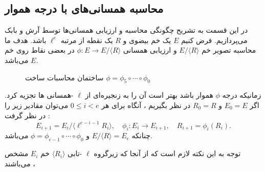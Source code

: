 \documentclass[12pt,a4paper]{article}
\begin{document}
\subsection{\bf   محاسبه همسانی‌های با درجه هموار}\label{smooth_isogeny}

در این قسمت به تشریح چگونگی محاسبه و ارزیابی همسانی‌ها توسط آرش و بابک می‌پردازیم. فرض کنیم 
$E$
یک خم بیضوی و 
$R$
یک نقطه از مرتبه 
$\ell^e$
باشد. هدف ما محاسبه تصویر خم 
$E/ \langle R \rangle $
و ارزیابی همسانی 
$\phi : E \rightarrow E/ \langle R \rangle $
در بعضی نقاط روی خم 
$E$
می‌باشد. 
\begin{figure}[H]\label{}
	\begin{center}
		
		
		\caption{
			ساختمان محاسبات ساخت 
			$\phi = {\phi}_5 \circ \cdots  \circ {\phi}_0$    
		}
		
	\end{center}
\end{figure}
زمانیکه درجه 
$\phi$
هموار باشد بهتر است آن را به زنجیره‌ای از
$\ell$
-همسانی ها تجزیه کرد. اگر
$E_0 = E$
و
$R_0 = R$
در نظر بگیریم ، آنگاه برای هر 
$0 \leq i < e $
می‌توان مقادیر زیر را در نظر گرفت :
$$
 E_{i+1} = E_i / \langle \ell^{e-i-1}R_i \rangle , \quad
 \phi_i : E_i \rightarrow E_{i+1} , \quad
 R_{i+1} = \phi_i(R_i).
$$
چنانکه 
$E / \langle R \rangle = E_e$
و
$\phi = \phi_{e-1} \circ \cdots \circ \phi_0$
می‌باشد.

توجه به این نکته لازم است که از آنجا که زیرگروه 
$\ell$
-تابی 
$\langle R_i \rangle $
خم 
$E_i$
مشخص می‌باشند ، 
\end{document}
